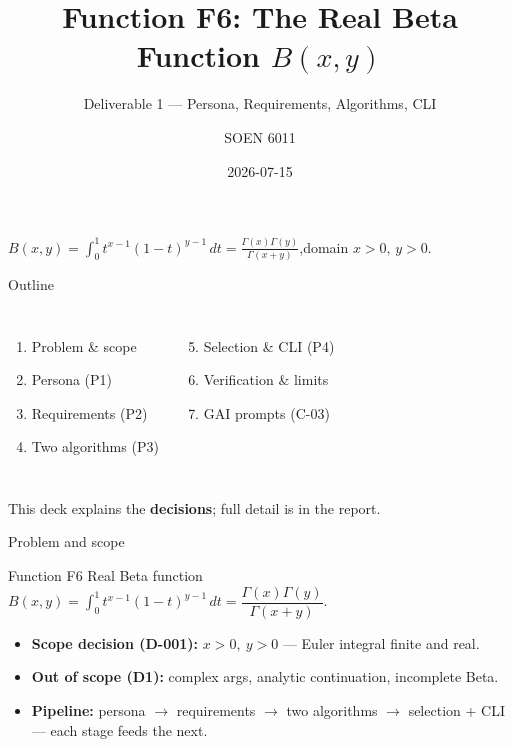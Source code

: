 \documentclass[aspectratio=169]{beamer}
\title[F6 Beta Function --- D1]{Function F6: The Real Beta Function $B(x,y)$}
\subtitle{Deliverable 1 --- Persona, Requirements, Algorithms, CLI}
\author{SOEN 6011}
\institute{Software Engineering Processes}
\date{2026-07-15}
\begin{document}
\begin{frame}[plain]
  \titlepage
  \centering\footnotesize
  $B(x,y)=\displaystyle\int_0^1 t^{x-1}(1-t)^{y-1}\,dt
         =\frac{\Gamma(x)\Gamma(y)}{\Gamma(x+y)}$,\quad domain $x>0,\,y>0$.
\end{frame}

\begin{frame}{Outline}
  \begin{columns}[t]
    \begin{enumerate}
      \item Problem \& scope
      \item Persona (P1)
      \item Requirements (P2)
      \item Two algorithms (P3)
    \end{enumerate}
    \begin{enumerate}\setcounter{enumi}{4}
      \item Selection \& CLI (P4)
      \item Verification \& limits
      \item GAI prompts (C-03)
    \end{enumerate}
  \end{columns}
  \vfill
  \footnotesize This deck explains the \textbf{decisions}; full detail is in the report.
\end{frame}

\begin{frame}{Problem and scope}
  \begin{block}{Function F6}
    Real Beta function
    $B(x,y)=\int_0^1 t^{x-1}(1-t)^{y-1}\,dt=\dfrac{\Gamma(x)\Gamma(y)}{\Gamma(x+y)}$.
  \end{block}
  \begin{itemize}
    \item \textbf{Scope decision (D-001):} $x>0,\ y>0$ --- Euler integral finite and real.
    \item \textbf{Out of scope (D1):} complex args, analytic continuation, incomplete Beta.
    \item \textbf{Pipeline:} persona $\rightarrow$ requirements $\rightarrow$ two algorithms
          $\rightarrow$ selection + CLI --- each stage feeds the next.
  \end{itemize}
\end{frame}
\end{document}
